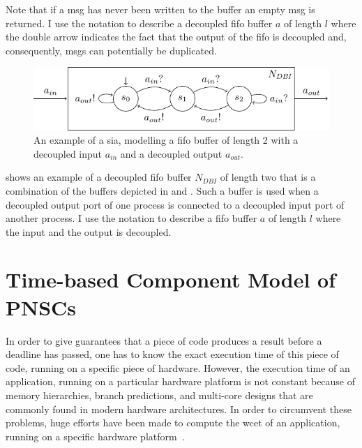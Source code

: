 Note that if a \gls*{msg} has never been written to the buffer an empty \gls*{msg} is returned.
I use the notation  to describe a decoupled \gls{fifo} buffer $a$ of length $l$ where the double arrow indicates the fact that the output of the \gls{fifo} is decoupled and, consequently, \glspl*{msg} can potentially be duplicated.

\begin{figure}[bht]
    \TopFigSpace
    \centering
    \includegraphics[width=12cm]{fig/sia_cci_bi.pdf}
    \CaptionFigSpace
    \caption{An example of a \gls{sia}, modelling a \gls{fifo} buffer of length 2 with a decoupled input $a_{in}$ and a decoupled output $a_{out}$.}
    \label{fig_sia_cci_bi}
    \BotFigSpace
\end{figure}
\Fig{\ref{fig_sia_cci_bi}} shows an example of a decoupled \gls{fifo} buffer $N_{\mathit{DBI}}$ of length two that is a combination of the buffers depicted in \Fig{\ref{fig_sia_cci_in}} and \Fig{\ref{fig_sia_cci_out}}.
Such a buffer is used when a decoupled output port of one process is connected to a decoupled input port of another process.
I use the notation  to describe a \gls{fifo} buffer $a$ of length $l$ where the input and the output is decoupled.

\section{Time-based Component Model of PNSCs}
\label{sect_tcm_time}
In order to give guarantees that a piece of code produces a result before a deadline has passed, one has to know the exact execution time of this piece of code, running on a specific piece of hardware.
However, the execution time of an application, running on a particular hardware platform is not constant because of memory hierarchies, branch predictions, and multi-core designs that are commonly found in modern hardware architectures.
In order to circumvent these problems, huge efforts have been made to compute the \gls{wcet} of an application, running on a specific hardware platform~\cite{wilhelm2008}.

